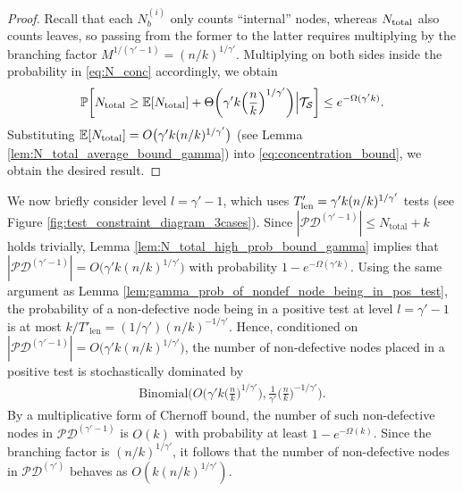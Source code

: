 \begin{proof}
Recall that each $N_b^{(i)}$ only counts ``internal'' nodes, whereas $N_{\rm total}$ also counts leaves, so passing from the former to the latter requires multiplying by the branching factor $M^{1/(\gamma'-1)}=(n/k)^{1/\gamma'}$.   Multiplying on both sides inside the probability in \eqref{eq:N_conc} accordingly, we obtain
\begin{align}
    \mathbb{P}\bigg[N_{\text{total}}\geq\mathbb{E}[N_{\text{total}}]+\Theta\bigg(\gamma'k\Big(\frac{n}{k}\Big)^{1/\gamma'}\bigg)\Big|\mathcal{T}_\mathcal{S}\bigg]\leq e^{-\Omega(\gamma'k)}. \label{eq:concentration_bound}
\end{align}
Substituting $\mathbb{E}[N_{\text{total}}]=O\big(\gamma'k(n/k)^{1/\gamma'}\big)$ (see Lemma \ref{lem:N_total_average_bound_gamma}) into \eqref{eq:concentration_bound}, we obtain the desired result.
\end{proof}

We now briefly consider level $l=\gamma'-1$, which uses $T'_{\rm len} = \gamma'k(n/k)^{1/\gamma'}$ tests (see Figure \ref{fig:test_constraint_diagram_3cases}).  Since $|\mathcal{PD}^{(\gamma'-1)}|\leq N_{\text{total}}+k$ holds trivially, Lemma \ref{lem:N_total_high_prob_bound_gamma} implies that $|\mathcal{PD}^{(\gamma'-1)}|=O\big(\gamma'k(n/k)^{1/\gamma'}\big)$ with probability $1-e^{-\Omega(\gamma' k)}$. Using the same argument as Lemma \ref{lem:gamma_prob_of_nondef_node_being_in_pos_test}, the probability of a non-defective node being in a positive test at level $l=\gamma'-1$ is at most $k/T'_{\text{len}}=(1/\gamma')(n/k)^{-1/\gamma'}$. Hence, conditioned on $|\mathcal{PD}^{(\gamma'-1)}|=O\big(\gamma'k(n/k)^{1/\gamma'}\big)$, the number of non-defective nodes placed in a positive test is stochastically dominated by
\begin{align}
    \text{Binomial}\bigg( O\Big( \gamma'k\Big(\frac{n}{k}\Big)^{1/\gamma'} \Big),\frac{1}{\gamma'}\Big(\frac{n}{k}\Big)^{-1/\gamma'}\bigg).
\end{align}
By a multiplicative form of Chernoff bound, the number of such non-defective nodes in $\mathcal{PD}^{(\gamma'-1)}$ is $O(k)$ with probability at least $1-e^{-\Omega(k)}$. Since the branching factor is $(n/k)^{1/\gamma'}$, it follows that the number of non-defective nodes in $\mathcal{PD}^{(\gamma')}$ behaves as $O(k(n/k)^{1/\gamma'})$.

